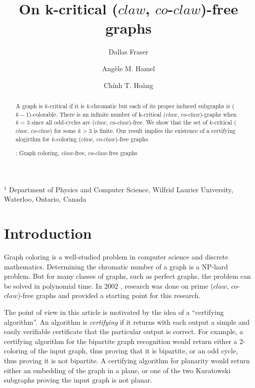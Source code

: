 \documentclass[12pt]{article}
\title{On k-critical ($claw$, $co$-$claw$)-free graphs}
\author{
  Dallas Fraser\inst{1}
  \and Ang\`ele M. Hamel\inst{1}
  \and Ch\'inh T. Ho\`ang\inst{1}
}
\def\inst#1{$^{#1}$}
\def\CCO{($claw$, $co$-$claw$)}
\begin{document}
\maketitle

\begin{center}
{\footnotesize

\inst{1} Department of Physics and Computer Science, Wilfrid Laurier
University, \\ Waterloo, Ontario, Canada}


\end{center}
%
\begin{abstract}
A graph is $k$-critical if it is $k$-chromatic but each of its proper
induced subgraphs is ($k-1$)-colorable. There is an infinite number of k-critical {\CCO}-graphs when $k = 3$ since all odd-cycles are {\CCO}-free. We show that the set of $k$-critical {\CCO} for some $k > 3$ is  finite. Our result implies the existence of a certifying alogirthm for $k$-coloring {\CCO}-free graphs. 

: Graph coloring, $claw$-free, $co$-$claw$-free graphs
\end{abstract}


\section{Introduction}\label{sec:intro}

Graph coloring is a well-studied problem in computer science and
discrete mathematics.  Determining the chromatic number of a graph
is a NP-hard problem.  But for many classes of graphs, such as
perfect graphs, the problem can be solved in polynomial time.
In 2002 \cite{BraFud2002}, research was done on  prime {\CCO}-free graphs and provided a starting point for this research.

The point of view in this article is motivated by the idea of a ``certifying algorithm''.  An algorithm is {\it certifying} if it returns with each output a simple and easily verifiable certificate that the particular output is correct.  For example, a certifying algorithm for the bipartite graph recognition would return either a 2-coloring of the input graph, thus proving that it is bipartite, or an odd cycle, thus proving it is not bipartite.  A certifying algorithm for planarity would return either an embedding of the graph in a plane, or one of the two Kuratowski subgraphs proving the input graph is not planar.
\end{document}
